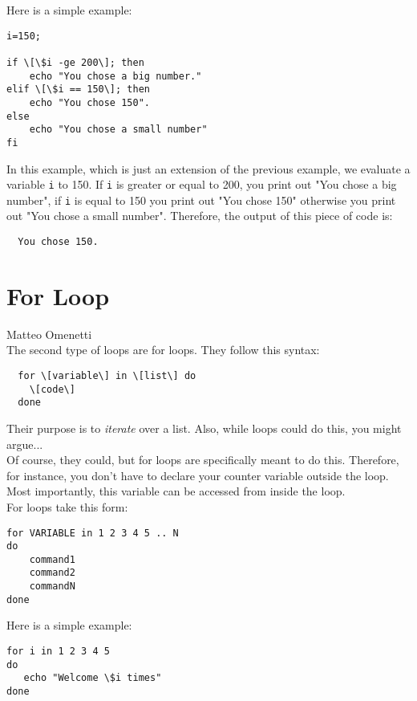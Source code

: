 \documentclass[hidelinks,12pt,a4paper,numbers=enddot]{scrartcl}
\begin{document}
Here is a simple example:

\begin{verbatim}
i=150;

if \[\$i -ge 200\]; then
    echo "You chose a big number."
elif \[\$i == 150\]; then
    echo "You chose 150".
else
    echo "You chose a small number"
fi
\end{verbatim}

In this example, which is just an extension of the previous example, we evaluate a
variable \texttt{i} to 150. If \texttt{i} is greater or equal to 200,
you print out "You chose a big number", if \texttt{i} is equal to 150 you print out
"You chose 150" otherwise you print out "You chose a small number".
Therefore, the output of this piece of code is:

\begin{verbatim}
  You chose 150.
\end{verbatim}

\section{For Loop}


\large Matteo Omenetti \normalsize\\




The second type of loops are for loops.
They follow this syntax:
\begin{verbatim}
  for \[variable\] in \[list\] do
    \[code\]
  done
\end{verbatim}

Their purpose is to \emph{iterate} over a list. Also, while loops could do this,
you might argue... \\
Of course, they could, but for loops are specifically meant to do this. Therefore, for instance,
you don't have to declare your counter variable outside the loop. Most importantly,
this variable can be accessed from inside the loop. \\

For loops take this form:
\begin{verbatim}
for VARIABLE in 1 2 3 4 5 .. N
do
    command1
    command2
    commandN
done
\end{verbatim}



Here is a simple example:
\begin{verbatim}
for i in 1 2 3 4 5
do
   echo "Welcome \$i times"
done
\end{verbatim}
\end{document}
